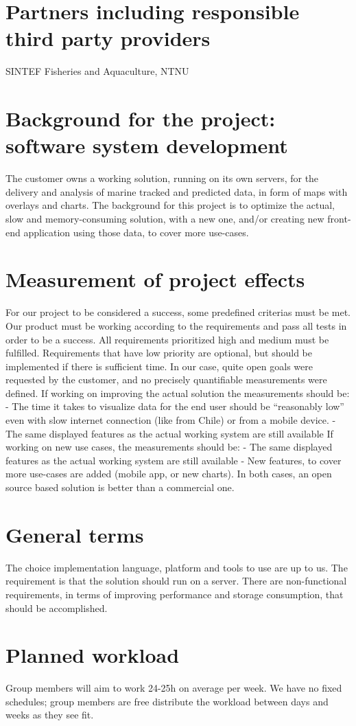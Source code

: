 \documentclass[11pt,a4paper,titlepage,oneside]{report}
\begin{document}
\section{Partners including responsible third party providers}
SINTEF Fisheries and Aquaculture, NTNU
\section{Background for the project: software system development}
The customer owns a working solution, running on its own servers, for the delivery and analysis of marine tracked and predicted data, in form of maps with overlays and charts.
The background for this project is to optimize the actual, slow and memory-consuming solution, with a new one, and/or creating new front-end application using those data, to cover more use-cases.
\section{Measurement of project effects}
For our project to be considered a success, some predefined criterias must be met. Our product must be working according to the requirements and pass all tests in order to be a success. All requirements prioritized high and medium must be fulfilled. Requirements that have low priority are optional, but should be implemented if there is sufficient time.
In our case, quite open goals were requested by the customer, and no precisely quantifiable measurements were defined.
If working on improving the actual solution the measurements should be:
- The time it takes to visualize data for the end user should be “reasonably low” even with slow internet connection (like from Chile) or from a mobile device.
- The same displayed features as the actual working system are still available
If working on new use cases, the measurements should be:
- The same displayed features as the actual working system are still available
- New features, to cover more use-cases are added (mobile app, or new charts).
In both cases, an open source based solution is better than a commercial one.
\section{General terms}
The choice implementation language, platform and tools to use are up to us. The requirement is that the solution should run on a server.
There are non-functional requirements, in terms of improving performance and storage consumption, that should be accomplished.
\section{Planned workload}
Group members will aim to work 24-25h on average per week. We have no fixed schedules; group members are free distribute the workload between days and weeks as they see fit.
\end{document}
